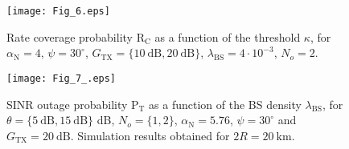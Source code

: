 \documentclass[10pt,journal,a4paper]{IEEEtran}
\begin{document}
\begin{figure}[t]
	\texttt{[image: Fig\_6.eps]}
\caption{Rate coverage probability $\mathrm{R}_\mathrm{C}$ as a function of the threshold $\kappa$, for $\alpha_\mathrm{N} = 4$, $\psi = 30^\circ$, $G_{\mathrm{TX}} = \{\SI{10}{\dB}, \SI{20}{\dB}\}$, $\lambda_\mathrm{BS} = 4 \cdot 10^{-3}$, $N_o = 2$.}
\label{fig.f_3}\vspace{-3mm}
\end{figure}

\begin{figure}[t]
\vspace{-8mm}
\centering
\texttt{[image: Fig\_7\_.eps]}
\caption{SINR outage probability $\mathrm{P}_{\mathrm{T}}$ as a function of the BS density $\lambda_\mathrm{BS}$, for $\theta = \{\SI{5}{\dB},\SI{15}{\dB}\}$ dB, $N_o = \{1, 2\}$, $\alpha_\mathrm{N} = 5.76$, $\psi = 30^\circ$ and \mbox{$G_{\mathrm{TX}} = \SI{20}{\dB}$}. Simulation results obtained for $2R = \SI{20}{\kilo\meter}$.}
\label{fig.f_4_SIM}
\vspace{-5mm}
\end{figure}
\end{document}
